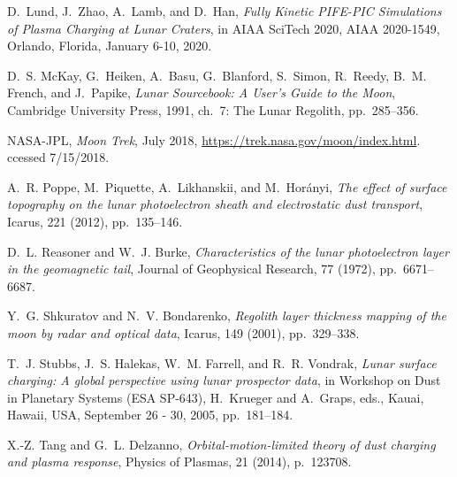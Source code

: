 \documentclass{siamart171218}
\begin{document}
\begin{thebibliography}{99}
{\sc D.~Lund, J.~Zhao, A.~Lamb, and D.~Han},
 {\em \textnormal{Fully Kinetic PIFE-PIC Simulations
  of Plasma Charging at Lunar Craters}}, in AIAA SciTech 2020, AIAA 2020-1549,
  Orlando, Florida, January 6-10, 2020.

{\sc D.~S. McKay, G.~Heiken, A.~Basu, G.~Blanford, S.~Simon, R.~Reedy, B.~M.
  French, and J.~Papike}, {\em Lunar Sourcebook: A User's Guide to the Moon},
  Cambridge University Press, 1991, ch.~7: The Lunar Regolith, pp.~285--356.

{\sc NASA-JPL}, {\em {M}oon {T}rek}, July 2018,
  \url{https://trek.nasa.gov/moon/index.html}.
ccessed 7/15/2018.

{\sc A.~R. Poppe, M.~Piquette, A.~Likhanskii, and M.~Hor\'{a}nyi}, {\em The
  effect of surface topography on the lunar photoelectron sheath and
  electrostatic dust transport}, Icarus, 221 (2012), pp.~135--146.

{\sc D.~L. Reasoner and W.~J. Burke}, {\em Characteristics of the lunar
  photoelectron layer in the geomagnetic tail}, Journal of Geophysical
  Research, 77 (1972), pp.~6671--6687.

{\sc Y.~G. Shkuratov and N.~V. Bondarenko}, {\em Regolith layer thickness
  mapping of the moon by radar and optical data}, Icarus, 149 (2001),
  pp.~329--338.

{\sc T.~J. Stubbs, J.~S. Halekas, W.~M. Farrell, and R.~R. Vondrak}, {\em Lunar
  surface charging: A global perspective using lunar prospector data}, in
  Workshop on Dust in Planetary Systems (ESA SP-643), H.~Krueger and A.~Graps,
  eds., Kauai, Hawaii, USA, September 26 - 30, 2005, pp.~181--184.

{\sc X.-Z. Tang and G.~L. Delzanno}, {\em Orbital-motion-limited theory of dust
  charging and plasma response}, Physics of Plasmas, 21 (2014), p.~123708.




\end{thebibliography}
\end{document}
